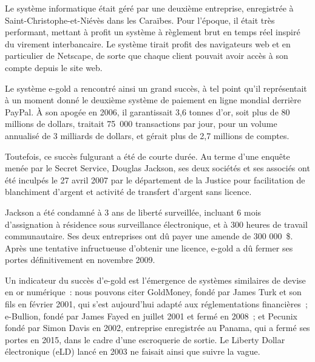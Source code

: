 Le système informatique était géré par une deuxième entreprise,  enregistrée à Saint-Christophe-et-Niévès dans les Caraïbes. Pour l'époque, il était très performant, mettant à profit un système à règlement brut en temps réel inspiré du virement interbancaire. Le système tirait profit des navigateurs web et en particulier de Netscape, de sorte que chaque client pouvait avoir accès à son compte depuis le site web.

Le système e-gold a rencontré ainsi un grand succès, à tel point qu'il représentait à un moment donné le deuxième système de paiement en ligne mondial derrière PayPal. À son apogée en 2006, il garantissait 3,6 tonnes d'or, soit plus de 80 millions de dollars, traitait 75~000 transactions par jour, pour un volume annualisé de 3 milliards de dollars, et gérait plus de 2,7 millions de comptes.

Toutefois, ce succès fulgurant a été de courte durée. Au terme d'une enquête menée par le Secret Service, Douglas Jackson, ses deux sociétés et ses associés ont été inculpés le 27 avril 2007 par le département de la Justice pour facilitation de blanchiment d'argent et activité de transfert d'argent sans licence.


Jackson a été condamné à 3 ans de liberté surveillée, incluant 6 mois d'assignation à résidence sous surveillance électronique, et à 300 heures de travail communautaire. Ses deux entreprises ont dû payer une amende de 300 000~\$. Après une tentative infructueuse d'obtenir une licence, e-gold a dû fermer ses portes définitivement en novembre 2009.

Un indicateur du succès d'e-gold est l'émergence de systèmes similaires de devise en or numérique~: nous pouvons citer GoldMoney, fondé par James Turk et son fils en février 2001, qui s'est aujourd'hui adapté aux réglementations financières~; e-Bullion, fondé par James Fayed en juillet 2001 et fermé en 2008~; et Pecunix fondé par Simon Davis en 2002, entreprise enregistrée au Panama, qui a fermé ses portes en 2015, dans le cadre d'une escroquerie de sortie. Le Liberty Dollar électronique (eLD) lancé en 2003 ne faisait ainsi que suivre la vague.

